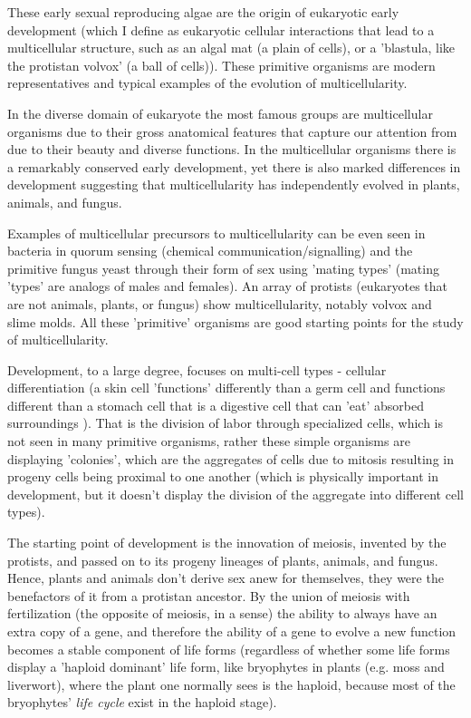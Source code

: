 These early sexual reproducing algae are the origin of eukaryotic early development (which I define as eukaryotic cellular interactions that lead to a multicellular structure, such as an algal mat (a plain of cells), or a 'blastula, like the protistan volvox' (a ball of cells)\cite{pmid7579526}).  These primitive organisms are modern representatives and typical examples of the evolution of multicellularity.  

In the diverse domain of eukaryote the most famous groups are multicellular organisms due to their gross anatomical features that capture our attention from due to their beauty and diverse functions.  In the multicellular organisms there is a remarkably conserved early development, yet there is also marked differences in development suggesting that multicellularity has independently evolved in plants, animals, and fungus.  

Examples of multicellular precursors to multicellularity can be even seen in bacteria in quorum sensing (chemical communication/signalling) and the primitive fungus yeast through their form of sex using 'mating types' (mating 'types' are analogs of males and females)\cite{pmid7579526}. An array of protists (eukaryotes that are not animals, plants, or fungus) show multicellularity, notably volvox and slime molds.  All these 'primitive' organisms are good starting points for the study of multicellularity. 

Development, to a large degree, focuses on multi-cell types - cellular differentiation (a skin cell 'functions' differently than a germ cell and functions different than a stomach cell that is a digestive cell that can 'eat' absorbed surroundings ).  That is the division of labor through specialized cells, which is not seen in many primitive organisms, rather these simple organisms are displaying 'colonies', which are the aggregates of cells due to mitosis resulting in progeny cells being proximal to one another (which is physically important in development, but it doesn't display the division of the aggregate into different cell types).

The starting point of development is the innovation of meiosis, invented by the protists, and passed on to its progeny lineages of plants, animals, and fungus.  Hence, plants and animals don't derive sex anew for themselves, they were the benefactors of it from a protistan ancestor.  By the union of meiosis with fertilization (the opposite of meiosis, in a sense) the ability to always have an extra copy of a gene, and therefore the ability of a gene to evolve a new function becomes a stable component of life forms (regardless of whether some life forms display a 'haploid dominant' life form, like bryophytes in plants (e.g. moss and liverwort), where the plant one normally sees is the haploid, because most of the bryophytes' \textit{life cycle} exist in the haploid stage).


